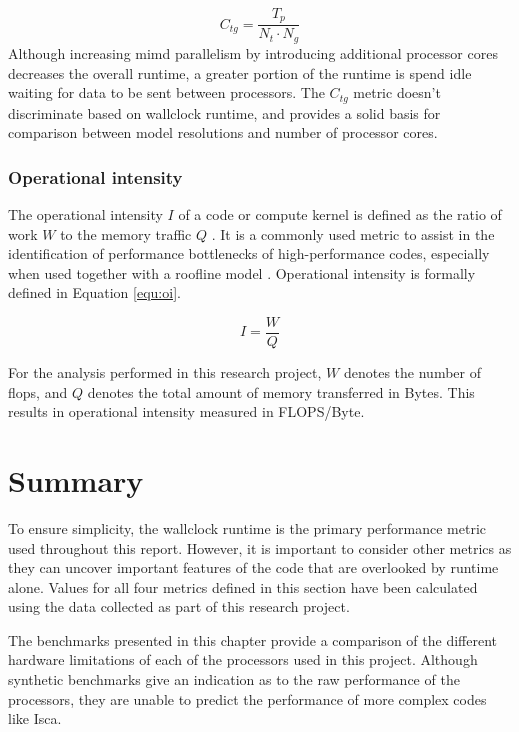 \documentclass[a4paper,11pt]{report}
\begin{document}
\begin{equation}
C_{tg} = \frac{T_p}{N_t \cdot N_g}
\label{equ:cost}
\end{equation}
Although increasing \gls{mimd} parallelism by introducing additional processor cores decreases the overall runtime, a greater portion of the runtime is spend idle waiting for data to be sent between processors. The $C_{tg}$ metric doesn't discriminate based on wallclock runtime, and provides a solid basis for comparison between model resolutions and number of processor cores. 

\subsubsection{Operational intensity}
The operational intensity $I$ of a code or compute kernel is defined as the ratio of work $W$ to the memory traffic $Q$ \cite{williams2009roofline}. It is a commonly used metric to assist in the identification of performance bottlenecks of high-performance codes, especially when used together with a roofline model \cite{williams2009roofline}. Operational intensity is formally defined in Equation \ref{equ:oi}.

\begin{equation}
\label{equ:oi}
I = \frac{W}{Q}
\end{equation}
\par
For the analysis performed in this research project, $W$ denotes the number of \gls{flops}, and $Q$ denotes the total amount of memory transferred in Bytes. This results in operational intensity measured in FLOPS/Byte. 

\section{Summary}
To ensure simplicity, the wallclock runtime is the primary performance metric used throughout this report. However, it is important to consider other metrics as they can uncover important features of the code that are overlooked by runtime alone. Values for all four metrics defined in this section have been calculated using the data collected as part of this research project. 
\par
The benchmarks presented in this chapter provide a comparison of the different hardware limitations of each of the processors used in this project. Although synthetic benchmarks give an indication as to the raw performance of the processors, they are unable to predict the performance of more complex codes like Isca.
\end{document}
